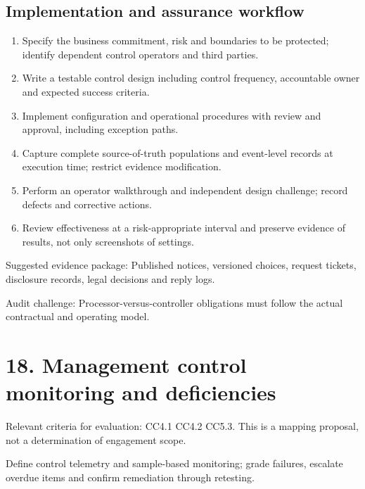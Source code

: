 \documentclass[10pt,oneside]{report}
\begin{document}
\subsection{Implementation and assurance workflow}
\begin{enumerate}
\item Specify the business commitment, risk and boundaries to be protected; identify dependent control operators and third parties.
\item Write a testable control design including control frequency, accountable owner and expected success criteria.
\item Implement configuration and operational procedures with review and approval, including exception paths.
\item Capture complete source-of-truth populations and event-level records at execution time; restrict evidence modification.
\item Perform an operator walkthrough and independent design challenge; record defects and corrective actions.
\item Review effectiveness at a risk-appropriate interval and preserve evidence of results, not only screenshots of settings.
\end{enumerate}

Suggested evidence package: Published notices, versioned choices, request tickets, disclosure records, legal decisions and reply logs.

Audit challenge: Processor-versus-controller obligations must follow the actual contractual and operating model.

\section{18. Management control monitoring and deficiencies}
Relevant criteria for evaluation: CC4.1 CC4.2 CC5.3. This is a mapping proposal, not a determination of engagement scope.

\begin{engineeringbox}
Define control telemetry and sample-based monitoring; grade failures, escalate overdue items and confirm remediation through retesting.
\end{engineeringbox}
\end{document}
